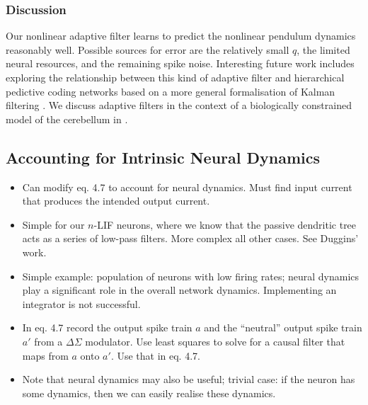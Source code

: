 \subsubsection{Discussion}

Our nonlinear adaptive filter learns to predict the nonlinear pendulum dynamics reasonably well.
Possible sources for error are the relatively small $q$, the limited neural resources, and the remaining spike noise.
Interesting future work includes exploring the relationship between this kind of adaptive filter and hierarchical pedictive coding networks based on a more general formalisation of Kalman filtering \citep{bastos2012canonical}.
We discuss adaptive filters in the context of a biologically constrained model of the cerebellum in .


\clearpage

\subsection{Accounting for Intrinsic Neural Dynamics}
\label{sec:temporal_tuning_neural_dynamics}

\begin{itemize}
	\item Can modify eq. 4.7 to account for neural dynamics. Must find input current that produces the intended output current.
	\item Simple for our $n$-LIF neurons, where we know that the passive dendritic tree acts as a series of low-pass filters. More complex all other cases. See Duggins' work.
	\item Simple example: population of \LIF neurons with low firing rates; neural dynamics play a significant role in the overall network dynamics. Implementing an integrator is not successful.
	\item In eq. 4.7 record the output spike train $a$ and the \enquote{neutral} output spike train $a'$ from a $\Delta\Sigma$ modulator. Use least squares to solve for a causal filter that maps from $a$ onto $a'$. Use that in eq. 4.7.
	\item Note that neural dynamics may also be useful; trivial case: if the neuron has some dynamics, then we can easily realise these dynamics.
\end{itemize}
